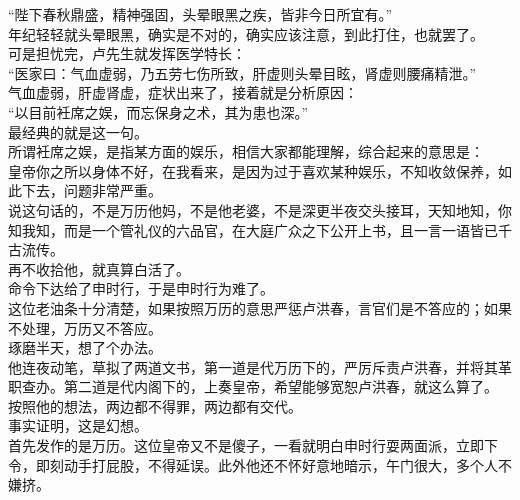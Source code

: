 \begin{multicols}{\theparacolNo}
“陛下春秋鼎盛，精神强固，头晕眼黑之疾，皆非今日所宜有。”\\

年纪轻轻就头晕眼黑，确实是不对的，确实应该注意，到此打住，也就罢了。\\

可是担忧完，卢先生就发挥医学特长：\\

“医家曰：气血虚弱，乃五劳七伤所致，肝虚则头晕目眩，肾虚则腰痛精泄。”\\

气血虚弱，肝虚肾虚，症状出来了，接着就是分析原因：\\

“以目前衽席之娱，而忘保身之术，其为患也深。”\\

最经典的就是这一句。\\

所谓衽席之娱，是指某方面的娱乐，相信大家都能理解，综合起来的意思是：\\

皇帝你之所以身体不好，在我看来，是因为过于喜欢某种娱乐，不知收敛保养，如此下去，问题非常严重。\\

说这句话的，不是万历他妈，不是他老婆，不是深更半夜交头接耳，天知地知，你知我知，而是一个管礼仪的六品官，在大庭广众之下公开上书，且一言一语皆已千古流传。\\

再不收拾他，就真算白活了。\\

命令下达给了申时行，于是申时行为难了。\\

这位老油条十分清楚，如果按照万历的意思严惩卢洪春，言官们是不答应的；如果不处理，万历又不答应。\\

琢磨半天，想了个办法。\\

他连夜动笔，草拟了两道文书，第一道是代万历下的，严厉斥责卢洪春，并将其革职查办。第二道是代内阁下的，上奏皇帝，希望能够宽恕卢洪春，就这么算了。\\

按照他的想法，两边都不得罪，两边都有交代。\\

事实证明，这是幻想。\\

首先发作的是万历。这位皇帝又不是傻子，一看就明白申时行耍两面派，立即下令，即刻动手打屁股，不得延误。此外他还不怀好意地暗示，午门很大，多个人不嫌挤。\\


\end{multicols}
